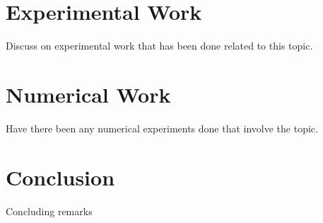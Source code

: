 \documentclass[10pt]{jfm}
\begin{document}
\section{Experimental Work}
Discuss on experimental work that has been done related to this topic.



\section{Numerical Work}
Have there been any numerical experiments done that involve the topic.



\section{Conclusion}
Concluding remarks




\end{document}
